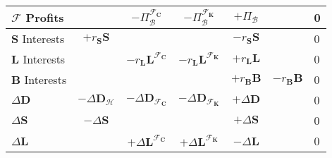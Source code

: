 \documentclass[a4paper, headings=standardclasses]{scrartcl}
\numberwithin{equation}{subsection}
\begin{document}
{\begin{tabularx}{\textwidth}{@{} Y|ccccc|l @{}}
        \midrule
        $\mathcal{F}$ Profits  &                                          & $-\Pi^{\mathcal{F}_{\mathbf{C}}}_\mathcal{B}$                   & $-\Pi^{\mathcal{F}_{\mathbf{K}}}_\mathcal{B}$                                          & $+\Pi_\mathcal{B}$           &                                          & 0                                 \\
        \midrule
        $\mathbf{S}$ Interests & $+r_{\mathbf{S}} \mathbf{S}$             &                                                                 &                                                                                        & $-r_{\mathbf{S}} \mathbf{S}$ &                                          & 0                                 \\
        $\mathbf{L}$ Interests &                                          & $-r_{\mathbf{L}} \mathbf{L}^{\mathcal{F}_{\mathbf{C}}}$         & $-r_{\mathbf{L}} \mathbf{L}^{\mathcal{F}_{\mathbf{K}}}$                                & $+r_{\mathbf{L}} \mathbf{L}$ &                                          & 0                                 \\
        $\mathbf{B}$ Interests &                                          &                                                                 &                                                                                        & $+r_\mathbf{B} \mathbf{B}$   & $-r_\mathbf{B} \mathbf{B}$               & 0                                 \\
        \midrule
        $\Delta\mathbf{D}$     & $-\Delta\mathbf{D}_\mathcal{H}$          & $-\Delta\mathbf{D}_{\mathcal{F}_{\mathbf{C}}}$                  & $-\Delta\mathbf{D}_{\mathcal{F}_{\mathbf{K}}}$                                         & $+\Delta\mathbf{D}$          &                                          & 0                                 \\
        $\Delta\mathbf{S}$     & $-\Delta\mathbf{S}$                      &                                                                 &                                                                                        & $+\Delta\mathbf{S}$          &                                          & 0                                 \\
        $\Delta\mathbf{L}$     &                                          & $+\Delta\mathbf{L}^{\mathcal{F}_{\mathbf{C}}}$                  & $+\Delta\mathbf{L}^{\mathcal{F}_{\mathbf{K}}}$                                         & $-\Delta\mathbf{L}$          &                                          & 0                                 \\

\end{tabularx}}
\end{document}

